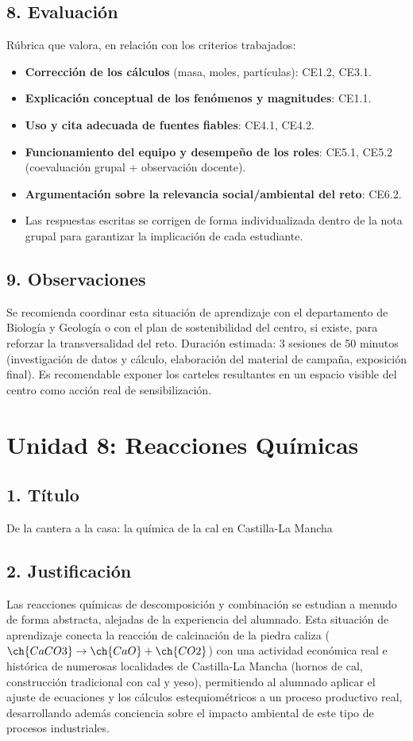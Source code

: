 \documentclass[11pt,a4paper]{article}
\begin{document}
\subsection*{8. Evaluación}
Rúbrica que valora, en relación con los criterios trabajados:
\begin{itemize}
    \item \textbf{Corrección de los cálculos} (masa, moles, partículas): CE1.2, CE3.1.
    \item \textbf{Explicación conceptual de los fenómenos y magnitudes}: CE1.1.
    \item \textbf{Uso y cita adecuada de fuentes fiables}: CE4.1, CE4.2.
    \item \textbf{Funcionamiento del equipo y desempeño de los roles}: CE5.1, CE5.2 (coevaluación grupal + observación docente).
    \item \textbf{Argumentación sobre la relevancia social/ambiental del reto}: CE6.2.
    \item Las respuestas escritas se corrigen de forma individualizada dentro de la nota grupal para garantizar la implicación de cada estudiante.
\end{itemize}

\subsection*{9. Observaciones}
Se recomienda coordinar esta situación de aprendizaje con el departamento de Biología y Geología o con el plan de sostenibilidad del centro, si existe, para reforzar la transversalidad del reto. Duración estimada: 3 sesiones de 50 minutos (investigación de datos y cálculo, elaboración del material de campaña, exposición final). Es recomendable exponer los carteles resultantes en un espacio visible del centro como acción real de sensibilización.

\newpage
\section{Unidad 8: Reacciones Químicas}
\subsection*{1. Título}
De la cantera a la casa: la química de la cal en Castilla-La Mancha

\subsection*{2. Justificación}
Las reacciones químicas de descomposición y combinación se estudian a menudo de forma abstracta, alejadas de la experiencia del alumnado. Esta situación de aprendizaje conecta la reacción de calcinación de la piedra caliza ($\ch{CaCO3} \rightarrow \ch{CaO} + \ch{CO2}$) con una actividad económica real e histórica de numerosas localidades de Castilla-La Mancha (hornos de cal, construcción tradicional con cal y yeso), permitiendo al alumnado aplicar el ajuste de ecuaciones y los cálculos estequiométricos a un proceso productivo real, desarrollando además conciencia sobre el impacto ambiental de este tipo de procesos industriales.
\end{document}

